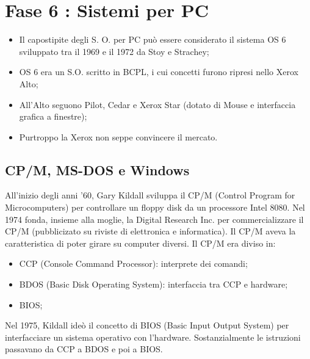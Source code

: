 
\section{Fase 6 : Sistemi per PC}

\begin{itemize}
    \item Il capostipite degli S. O. per PC può essere considerato il sistema
    OS 6 sviluppato tra il 1969 e il 1972 da Stoy e Strachey;
    \item OS 6 era un S.O. scritto in BCPL, i cui concetti furono ripresi
    nello Xerox Alto;
    \item All'Alto seguono Pilot, Cedar e Xerox Star (dotato di Mouse e interfaccia grafica a finestre);
    \item Purtroppo la Xerox non seppe convincere il mercato.
\end{itemize}

\subsection{CP/M, MS-DOS e Windows}

All'inizio degli anni '60, Gary Kildall sviluppa il CP/M (Control Program for Microcomputers)
per controllare un floppy disk da un processore Intel 8080.
Nel 1974 fonda, insieme alla moglie, la Digital Research Inc. per commercializzare il CP/M 
(pubblicizato su riviste di elettronica e informatica). Il CP/M aveva la
caratteristica di poter girare su computer diversi. Il CP/M era diviso in:

\begin{itemize}
    \item CCP (Console Command Processor): interprete dei comandi;
    \item BDOS (Basic Disk Operating System): interfaccia tra CCP e hardware;
    \item BIOS;
\end{itemize}

Nel 1975, Kildall ideò il concetto di BIOS (Basic Input Output System) per
interfacciare un sistema operativo con l'hardware. Sostanzialmente le istruzioni
passavano da CCP a BDOS e poi a BIOS.


